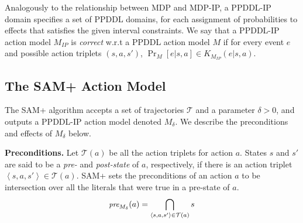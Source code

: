 \documentclass[letterpaper]{article} %
\newtheorem{definition}{Definition}
\newcommand{\pre}{\textit{pre}}
\newcommand{\tuple}[1]{\ensuremath{\left \langle #1 \right \rangle }}
\newcommand{\ip}{\textit{IP}}
\begin{document}
Analogously to the relationship between MDP and MDP-IP, a PPDDL-IP domain specifies a set of PPDDL domains, for each assignment of probabilities to effects that satisfies the given interval constraints. 
We say that a PPDDL-IP action model $M_\ip$ is  \emph{correct} w.r.t a PPDDL action model $M$ if for every event $e$ and possible action triplets $(s,a,s')$, $\Pr_{M}[e|s,a]\in K_{M_{IP}}(e|s,a)$.






\subsection{The SAM+ Action Model}


The SAM+ algorithm accepts a set of trajectories $\mathcal{T}$ and a parameter $\delta>0$, and outputs a PPDDL-IP action model denoted $M_\delta$. We describe the preconditions and effects of $M_\delta$ below. 

\noindent \textbf{Preconditions.} 
Let $\mathcal{T}(a)$ be all the action triplets for action $a$. 
States $s$ and $s'$ are said to be a \emph{pre-} and \emph{post-state} of $a$, respectively, if there is an action triplet $\tuple{s,a,s'}\in \mathcal{T}(a)$. 
SAM+ sets the preconditions of an action $a$ to be intersection over all the literals that were true in a pre-state of $a$. 
\begin{equation}
\small
        \pre_{M_\delta}(a) =  \bigcap_{\tuple{s, a, s'}\in \mathcal{T}(a)} s \label{eq:pre} 
\end{equation}        
\end{document}
